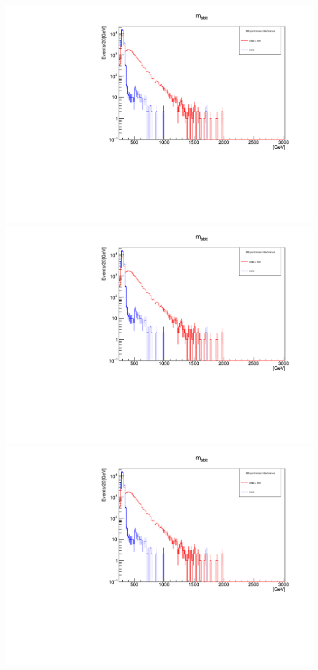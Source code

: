 \documentclass[a4wide,10pt]{article}
\begin{document}
\includegraphics[scale=0.50,page=4]{InterferencePlots01p.pdf}
\includegraphics[scale=0.50,page=5]{InterferencePlots01p.pdf}
\includegraphics[scale=0.50,page=6]{InterferencePlots01p.pdf}
\end{document}

